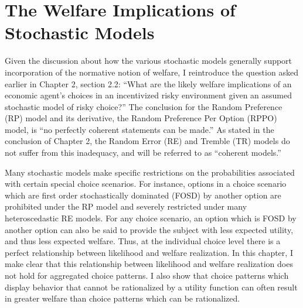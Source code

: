 \documentclass[../main.tex]{subfiles}
\begin{document}
\doublespacing
\setcounter{chapter}{2}

\singlespacing
\chapter{The Welfare Implications of Stochastic Models}
\doublespacing

\lltoc %

Given the discussion about how the various stochastic models generally support incorporation of the normative notion of welfare, I reintroduce the question asked earlier in Chapter 2, section 2.2:
\enquote{What are the likely welfare implications of an economic agent's choices in an incentivized risky environment given an assumed stochastic model of risky choice?}
The conclusion for the Random Preference (RP) model and its derivative, the Random Preference Per Option (RPPO) model, is \enquote{no perfectly coherent statements can be made.}
As stated in the conclusion of Chapter 2, the Random Error (RE) and Tremble (TR) models do not suffer from this inadequacy, and will be referred to as \enquote{coherent models.}

Many stochastic models make specific restrictions on the probabilities associated with certain special choice scenarios.
For instance, options in a choice scenario which are first order stochastically dominated (FOSD) by another option are prohibited under the RP model and severely restricted under many heteroscedastic RE models.
For any choice scenario, an option which is FOSD by another option can also be said to provide the subject with less expected utility, and thus less expected welfare.
Thus, at the individual choice level there is a perfect relationship between likelihood and welfare realization.
In this chapter, I make clear that this relationship between likelihood and welfare realization does not hold for aggregated choice patterns.
I also show that choice patterns which display behavior that cannot be rationalized by a utility function can often result in greater welfare than choice patterns which can be rationalized.
\end{document}
